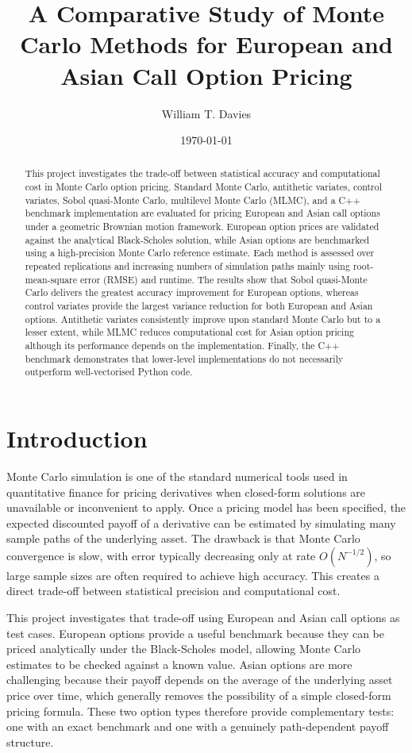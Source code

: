 \documentclass[11pt]{article}
\title{A Comparative Study of Monte Carlo Methods for European and Asian Call Option Pricing}
\author{William T. Davies}
\date{\today}
\begin{document}
\maketitle

\begin{abstract}
This project investigates the trade-off between statistical accuracy and computational cost in Monte Carlo option pricing. Standard Monte Carlo, antithetic variates, control variates, Sobol quasi-Monte Carlo, multilevel Monte Carlo (MLMC), and a C++ benchmark implementation are evaluated for pricing European and Asian call options under a geometric Brownian motion framework. European option prices are validated against the analytical Black-Scholes solution, while Asian options are benchmarked using a high-precision Monte Carlo reference estimate. Each method is assessed over repeated replications and increasing numbers of simulation paths mainly using root-mean-square error (RMSE) and runtime. The results show that Sobol quasi-Monte Carlo delivers the greatest accuracy improvement for European options, whereas control variates provide the largest variance reduction for both European and Asian options. Antithetic variates consistently improve upon standard Monte Carlo but to a lesser extent, while MLMC reduces computational cost for Asian option pricing although its performance depends on the implementation. Finally, the C++ benchmark demonstrates that lower-level implementations do not necessarily outperform well-vectorised Python code.
\end{abstract}


\section{Introduction}

Monte Carlo simulation is one of the standard numerical tools used in quantitative finance for pricing derivatives when closed-form solutions are unavailable or inconvenient to apply. Once a pricing model has been specified, the expected discounted payoff of a derivative can be estimated by simulating many sample paths of the underlying asset. The drawback is that Monte Carlo convergence is slow, with error typically decreasing only at rate $O(N^{-1/2})$, so large sample sizes are often required to achieve high accuracy. This creates a direct trade-off between statistical precision and computational cost.

This project investigates that trade-off using European and Asian call options as test cases. European options provide a useful benchmark because they can be priced analytically under the Black-Scholes model, allowing Monte Carlo estimates to be checked against a known value. Asian options are more challenging because their payoff depends on the average of the underlying asset price over time, which generally removes the possibility of a simple closed-form pricing formula. These two option types therefore provide complementary tests: one with an exact benchmark and one with a genuinely path-dependent payoff structure.
\end{document}
